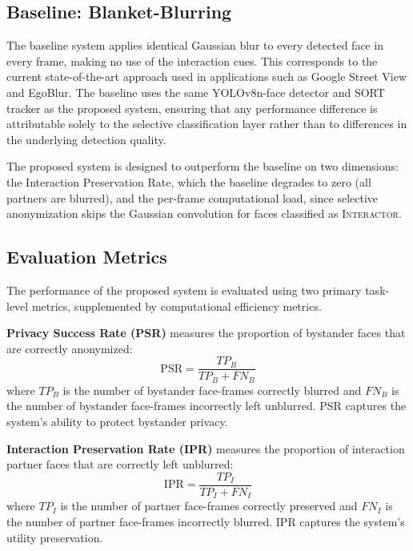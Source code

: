 \subsection{Baseline: Blanket-Blurring}

The baseline system applies identical Gaussian blur to every detected face in every frame,
making no use of the interaction cues. This corresponds to the current state-of-the-art
approach used in applications such as Google Street View and EgoBlur. The baseline uses
the same YOLOv8n-face detector and SORT tracker as the proposed system, ensuring that any
performance difference is attributable solely to the selective classification layer rather
than to differences in the underlying detection quality.

The proposed system is designed to outperform the baseline on two dimensions: the
Interaction Preservation Rate, which the baseline degrades to zero (all partners are
blurred), and the per-frame computational load, since selective anonymization skips the
Gaussian convolution for faces classified as \textsc{Interactor}.

\subsection{Evaluation Metrics}

The performance of the proposed system is evaluated using two primary task-level metrics,
supplemented by computational efficiency metrics.

\textbf{Privacy Success Rate (PSR)} measures the proportion of bystander faces that
are correctly anonymized:
\begin{equation}
  \mathrm{PSR} = \frac{TP_B}{TP_B + FN_B}
  \label{eq:psr}
\end{equation}
where $TP_B$ is the number of bystander face-frames correctly blurred and $FN_B$ is the
number of bystander face-frames incorrectly left unblurred. PSR captures the system's
ability to protect bystander privacy.

\textbf{Interaction Preservation Rate (IPR)} measures the proportion of interaction
partner faces that are correctly left unblurred:
\begin{equation}
  \mathrm{IPR} = \frac{TP_I}{TP_I + FN_I}
  \label{eq:ipr}
\end{equation}
where $TP_I$ is the number of partner face-frames correctly preserved and $FN_I$ is the
number of partner face-frames incorrectly blurred. IPR captures the system's utility
preservation.

